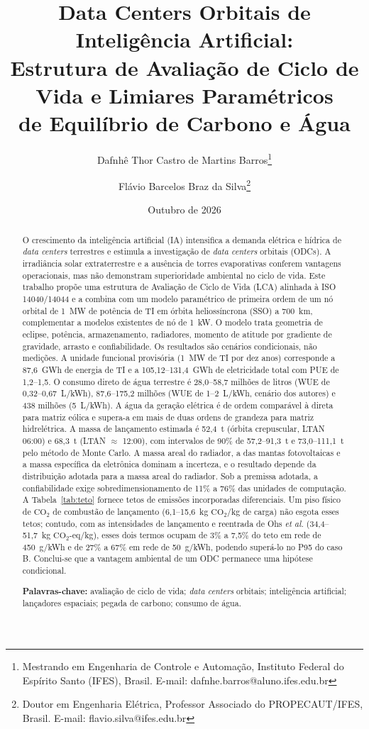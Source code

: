 \documentclass[11pt,a4paper]{article}
\title{\textbf{Data Centers Orbitais de Inteligência Artificial:\\
Estrutura de Avaliação de Ciclo de Vida e Limiares Paramétricos\\
de Equilíbrio de Carbono e Água}}
\author{
  Dafnhê Thor Castro de Martins Barros\thanks{Mestrando em Engenharia de Controle e Automação, Instituto Federal do Espírito Santo (IFES), Brasil. E-mail: dafnhe.barros@aluno.ifes.edu.br}
  \and
  Flávio Barcelos Braz da Silva\thanks{Doutor em Engenharia Elétrica, Professor Associado do PROPECAUT/IFES, Brasil. E-mail: flavio.silva@ifes.edu.br}
}
\date{Outubro de 2026}
\newcommand{\CO}{\ensuremath{\mathrm{CO_2}}}
\newcommand{\COeq}{\ensuremath{\mathrm{CO_2}\text{-eq}}}
\begin{document}
\maketitle

\begin{abstract}
\noindent
O crescimento da inteligência artificial (IA) intensifica a demanda elétrica e
hídrica de \emph{data centers} terrestres e estimula a investigação de
\emph{data centers} orbitais (ODCs). A irradiância solar extraterrestre e a
ausência de torres evaporativas conferem vantagens operacionais, mas não
demonstram superioridade ambiental no ciclo de vida. Este trabalho propõe uma
estrutura de Avaliação de Ciclo de Vida (LCA) alinhada à ISO 14040/14044 e a
combina com um modelo paramétrico de primeira ordem de um nó orbital de 1~MW de
potência de TI em órbita heliossíncrona (SSO) a 700~km, complementar a modelos
existentes de nó de 1~kW. O modelo trata geometria de eclipse, potência,
armazenamento, radiadores, momento de atitude por gradiente de gravidade,
arrasto e confiabilidade. Os resultados são cenários condicionais, não
medições. A unidade funcional provisória (1~MW de TI por dez anos) corresponde
a 87,6~GWh de energia de TI e a 105,12--131,4~GWh de eletricidade total com PUE
de 1,2--1,5. O consumo direto de água terrestre é 28,0--58,7 milhões de litros
(WUE de 0,32--0,67~L/kWh), 87,6--175,2 milhões (WUE de 1--2~L/kWh, cenário dos
autores) e 438 milhões (5~L/kWh). A água da geração elétrica é de ordem
comparável à direta para matriz eólica e supera-a em mais de duas ordens de
grandeza para matriz hidrelétrica. A massa de lançamento estimada é 52,4~t
(órbita crepuscular, LTAN 06:00) e 68,3~t (LTAN $\approx$ 12:00), com
intervalos de 90\% de 57,2--91,3~t e 73,0--111,1~t pelo método de Monte Carlo.
A massa areal do radiador, a das mantas fotovoltaicas e a massa específica da
eletrônica dominam a incerteza, e o resultado depende da distribuição adotada
para a massa areal do radiador. Sob a premissa adotada, a confiabilidade exige
sobredimensionamento de 11\% a 76\% das unidades de computação. A
Tabela~\ref{tab:teto} fornece tetos de emissões incorporadas diferenciais. Um
piso físico de $\CO$ de combustão de lançamento (6,1--15,6~kg $\CO$/kg de
carga) não esgota esses tetos; contudo, com as intensidades de lançamento e
reentrada de Ohs \emph{et al.} (34,4--51,7~kg $\COeq$/kg), esses dois termos
ocupam de 3\% a 7,5\% do teto em rede de 450~g/kWh e de 27\% a 67\% em rede de
50~g/kWh, podendo superá-lo no P95 do caso B. Conclui-se que a vantagem
ambiental de um ODC permanece uma hipótese condicional.

\medskip
\noindent\textbf{Palavras-chave:} avaliação de ciclo de vida; \emph{data
centers} orbitais; inteligência artificial; lançadores espaciais; pegada de
carbono; consumo de água.
\end{abstract}
\end{document}
